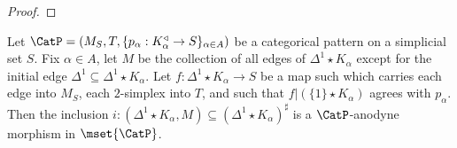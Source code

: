 \begin{proof}





\end{proof}

\begin{lemma}\label{swindler}
Let $\CatP = (M_S, T, \{ p_{\alpha}: K_{\alpha}^{\triangleleft} \rightarrow S\}_{\alpha \in A})$
be a categorical pattern on a simplicial set $S$. Fix $\alpha \in A$, let $M$ be the
collection of all edges of $\Delta^1 \star K_{\alpha}$ except for the initial edge
$\Delta^1 \subseteq \Delta^1 \star K_{\alpha}$. Let $f: \Delta^1 \star K_{\alpha} \rightarrow S$
be a map such which carries each edge into $M_S$, each $2$-simplex into $T$, and such that $f | ( \{1\} \star K_{\alpha} )$ agrees with $p_{\alpha}$.
Then the inclusion $i: ( \Delta^1 \star K_{\alpha}, M) \subseteq ( \Delta^1 \star K_{\alpha})^{\sharp}$ is
a $\CatP$-anodyne morphism in $\mset{ \CatP}$.
\end{lemma}

